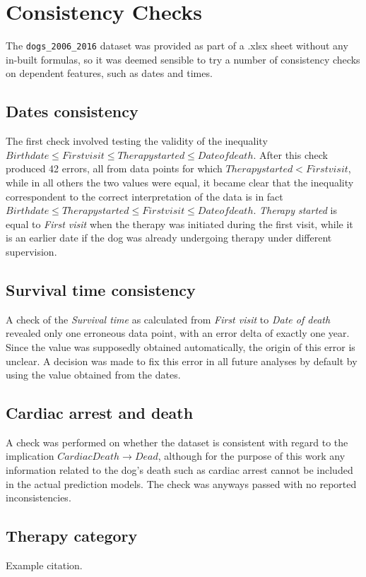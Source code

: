 \documentclass[12pt]{report}
\begin{document}
\section*{Consistency Checks}
The \texttt{dogs\_2006\_2016} dataset was provided as part of a .xlsx sheet without any in-built formulas, so it was deemed sensible to try a number of consistency checks on dependent features, such as dates and times.
\subsection*{Dates consistency}
The first check involved testing the validity of the inequality $ Birth date \leq First visit \leq Therapy started \leq Date of death $. After this check produced 42 errors, all from data points for which $ Therapy started < First visit $, while in all others the two values were equal, it became clear that the inequality correspondent to the correct interpretation of the data is in fact $ Birth date \leq Therapy started \leq First visit \leq Date of death $. \textit{Therapy started} is equal to \textit{First visit} when the therapy was initiated during the first visit, while it is an earlier date if the dog was already undergoing therapy under different supervision.
\subsection*{Survival time consistency}
A check of the \textit{Survival time} as calculated from \textit{First visit} to \textit{Date of death} revealed only one erroneous data point, with an error delta of exactly one year. Since the value was supposedly obtained automatically, the origin of this error is unclear. A decision was made to fix this error in all future analyses by default by using the value obtained from the dates.
\subsection*{Cardiac arrest and death}
A check was performed on whether the dataset is consistent with regard to the implication $ CardiacDeath \rightarrow Dead $, although for the purpose of this work any information related to the dog's death such as cardiac arrest cannot be included in the actual prediction models. The check was anyways passed with no reported inconsistencies.
\subsection*{Therapy category}


%
%
\begin{thebibliography}{00}
%
Example citation.

%
\end{thebibliography}
% 
\end{document}
